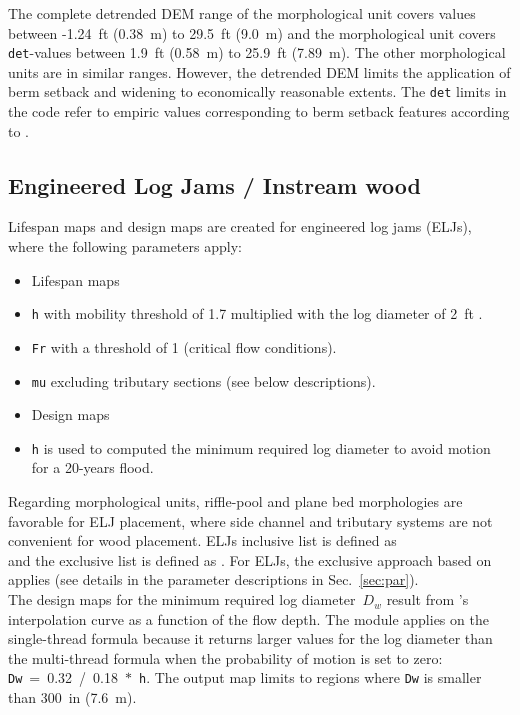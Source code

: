 The complete detrended DEM range of the morphological unit  covers values between -1.24~ft (0.38~m) to 29.5~ft (9.0~m) and the morphological unit  covers \texttt{det}-values between 1.9~ft (0.58~m) to 25.9~ft (7.89~m). The other morphological units are in similar ranges. However, the detrended DEM limits the application of berm setback and widening to economically reasonable extents. The \texttt{det} limits in the code refer to empiric values corresponding to berm setback features according to \citep{ycwa16}.


\subsection{Engineered Log Jams / Instream wood}\label{sec:ejl}
Lifespan maps and design maps are created for engineered log jams (ELJs), where the following parameters apply:

\begin{itemize}
	\item[] Lifespan maps
	\item \texttt{h} with mobility threshold of 1.7 multiplied with the log diameter of 2~ft \citep[0.6~m][]{lange06, ycwa16}.
	\item \texttt{Fr} with a threshold of 1 (critical flow conditions).
	\item \texttt{mu} excluding tributary sections (see below descriptions).
	\item[] Design maps
	\item \texttt{h} is used to computed the minimum required log diameter to avoid motion for a 20-years flood.
\end{itemize}

Regarding morphological units, riffle-pool and plane bed morphologies are favorable for ELJ placement, where side channel and tributary systems are not convenient for wood placement. ELJs inclusive list is defined as \pythoninline{mu_good = ["riffle", "riffle transition", "pool", "floodplain", "island floodplain", "lateral bar", "medial bar",}\\
\pythoninline{" run"]} and the exclusive list is defined as . For ELJs, the exclusive approach based on  applies (see details in the parameter descriptions in Sec.~\ref{sec:par}).\\

The design maps for the minimum required log diameter~$D_w$ result from \citep{ruiz16b}'s interpolation curve as a function of the flow depth. The module applies on the single-thread formula because it returns larger values for the log diameter than the multi-thread formula when the probability of motion is set to zero: \texttt{Dw}~=~0.32~/~0.18~$*$~\texttt{h}. The output map limits to regions where \texttt{Dw} is smaller than 300~in (7.6~m).

